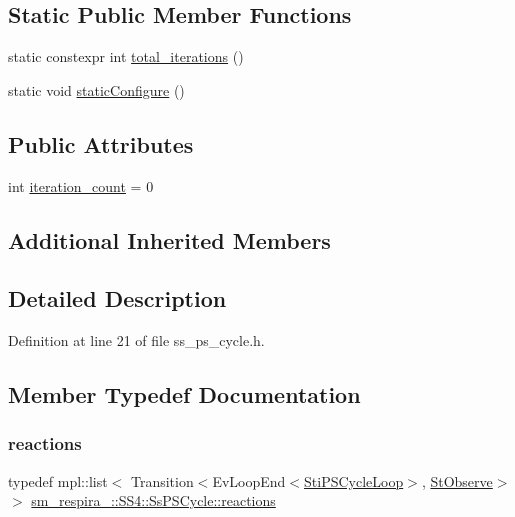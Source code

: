 \subsection*{Static Public Member Functions}
\begin{DoxyCompactItemize}
\item 
static constexpr int \hyperlink{structsm__respira__1_1_1SS4_1_1SsPSCycle_a812d9e6bd288fe71ad44d30b4e63bc87}{total\+\_\+iterations} ()
\item 
static void \hyperlink{structsm__respira__1_1_1SS4_1_1SsPSCycle_a1d9cf15cc9fc3453cc3bafed4b18d313}{static\+Configure} ()
\end{DoxyCompactItemize}
\subsection*{Public Attributes}
\begin{DoxyCompactItemize}
\item 
int \hyperlink{structsm__respira__1_1_1SS4_1_1SsPSCycle_aeb5bdbd23c6c8b5614d7f3cca52216bd}{iteration\+\_\+count} = 0
\end{DoxyCompactItemize}
\subsection*{Additional Inherited Members}


\subsection{Detailed Description}


Definition at line 21 of file ss\+\_\+ps\+\_\+cycle.\+h.



\subsection{Member Typedef Documentation}
\mbox{\label{structsm__respira__1_1_1SS4_1_1SsPSCycle_aad6397ffff7eef88efc3824b91423462}} 
\subsubsection{\texorpdfstring{reactions}{reactions}}
{\footnotesize\ttfamily typedef mpl\+::list$<$ Transition$<$Ev\+Loop\+End$<$\hyperlink{structsm__respira__1_1_1cmv__cycle__inner__states_1_1StiPSCycleLoop}{Sti\+P\+S\+Cycle\+Loop}$>$, \hyperlink{structsm__respira__1_1_1StObserve}{St\+Observe}$>$ $>$ \hyperlink{structsm__respira__1_1_1SS4_1_1SsPSCycle_aad6397ffff7eef88efc3824b91423462}{sm\+\_\+respira\+\_\+::\+S\+S4\+::\+Ss\+P\+S\+Cycle\+::reactions}}



